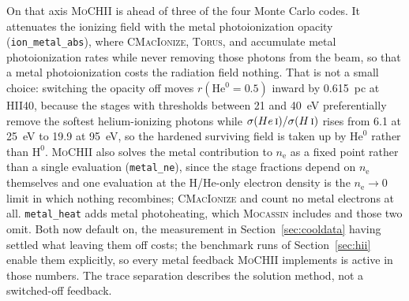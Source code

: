 \documentclass[twocolumn,linenumbers]{aastex702}
\newcommand{\code}[1]{\texttt{#1}}
\newcommand{\MoCHII}{\textsc{MoCHII}}
\newcommand{\HI}{H\,\textsc{i}}
\newcommand{\HeI}{He\,\textsc{i}}
\newcommand{\nelec}{n_{\mathrm{e}}}
\begin{document}
On that axis \MoCHII{} is ahead of three of the four Monte Carlo codes.  It
attenuates the ionizing field with the metal photoionization opacity
(\code{ion\_metal\_abs}), where \textsc{CMacIonize}, \textsc{Torus}, and
\citet{wood2004} accumulate metal photoionization rates while never removing
those photons from the beam, so that a metal photoionization costs the
radiation field nothing.  That is not a small choice: switching the opacity
off moves $r(\mathrm{He}^{0}\!=\!0.5)$ inward by 0.615~pc at HII40, because
the stages with thresholds between 21 and 40~eV preferentially remove the
softest helium-ionizing photons while $\sigma(\HeI)/\sigma(\HI)$ rises from
6.1 at 25~eV to 19.9 at 95~eV, so the hardened surviving field is taken up by
$\mathrm{He}^{0}$ rather than $\mathrm{H}^{0}$.  \MoCHII{} also solves the
metal contribution to $\nelec$ as a fixed point rather than a single
evaluation (\code{metal\_ne}), since the stage fractions depend on $\nelec$
themselves and one evaluation at the H/He-only electron density is the
$\nelec \to 0$ limit in which nothing recombines; \textsc{CMacIonize} and
\citet{wood2004} count no metal electrons at all.  \code{metal\_heat} adds
metal photoheating, which \textsc{Mocassin} includes and those two omit.
Both now default on, the measurement in
Section~\ref{sec:cooldata} having settled what leaving them off costs; the
benchmark runs of Section~\ref{sec:hii} enable them explicitly, so every metal
feedback \MoCHII{} implements is active in those numbers.  The trace
separation describes the solution method, not a switched-off feedback.
\end{document}
